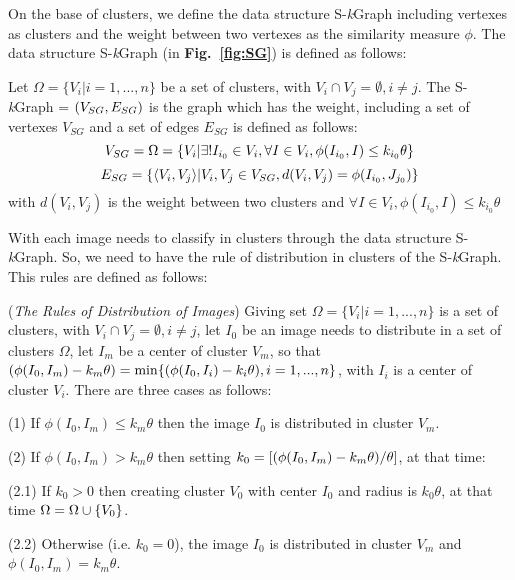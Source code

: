\documentclass{amcs}
\begin{document}
On the base of clusters, we define the data structure S-\textit{k}Graph including vertexes as clusters and the weight between two vertexes as the similarity measure $\phi $. The data structure S-\textit{k}Graph (in \textbf{Fig.~\ref{fig:SG}}) is defined as follows:
\begin{definition}{} Let $\Omega  = \{ {V_i}|i = 1,...,n\} $ be a set of clusters, with ${V_i} \cap {V_j} = \emptyset ,i \ne j$. The S-\textit{k}Graph = $\left( {{V_{SG}},{\rm{ }}{E_{SG}}} \right)$ is the graph which has the weight, including a set of vertexes ${V_{SG}}$ and a set of edges ${E_{SG}}$ is defined as follows:
\begin{equation}
\footnotesize {V_{SG}} = \Omega  = {\rm{\{ }}{V_i}|\exists !{I_{{i_0}}} \in {V_i},\forall I \in {V_i},\phi ({I_{{i_0}}},I) \le {k_{{i_0}}}\theta{\rm{\} }}
\end{equation}
\begin{equation}
\footnotesize {E_{SG}} = \{ \langle {V_i},{V_j}\rangle |{V_i},{V_j} \in {V_{SG}},d({V_i},{V_j}) = \phi ({I_{{i_0}}},{J_{{j_0}}})\}
\end{equation}
with $d({V_i},{V_j})$ is the weight between two clusters and $\forall I \in {V_i},\phi ({I_{{i_0}}},I) \le {k_{{i_0}}}\theta $
\label{def:SG}
\end{definition}

With each image needs to classify in clusters through the data structure S-\textit{k}Graph. So, we need to have the rule of distribution in clusters of the S-\textit{k}Graph. This rules are defined as follows:
\begin{definition}{} (\textit{The Rules of Distribution of Images}) Giving set $\Omega  = \{ {V_i}|i = 1,...,n\} $ is a set of clusters, with ${V_i} \cap {V_j} = \emptyset ,i \ne j$, let ${I_0}$ be an image needs to distribute in a set of clusters $\Omega $, let ${I_m}$ be a center of cluster ${V_m}$, so that $(\phi ({I_0},{I_m}) - {k_m}\theta ) = \min \{ (\phi ({I_0},{I_i}) - {k_i}\theta ),i = 1,...,n{\rm{\} }}$, with ${I_i}$ is a center of cluster ${V_i}$. There are three cases as follows:

(1) If $\phi ({I_0},{I_m}) \le {k_m}\theta $ then the image ${I_0}$ is distributed in cluster ${V_m}$.

(2) If $\phi ({I_0},{I_m}) > {k_m}\theta $ then setting ${k_0} = \left[ {{{(\phi ({I_0},{I_m}) - {k_m}\theta )} \mathord{\left/
 {\vphantom {{(\phi ({I_0},{I_m}) - {k_m}\theta )} \theta }} \right.
 \kern-\nulldelimiterspace} \theta }} \right]$, at that time: 

(2.1) If ${k_0} > 0$ then creating cluster ${V_0}$ with center ${I_0}$ and radius is ${k_0}\theta $, at that time $\Omega  = \Omega  \cup {\rm{\{ }}{V_0}{\rm{\} }}$.

(2.2) Otherwise (i.e. ${k_0} = 0$), the image ${I_0}$ is distributed in cluster ${V_m}$ and $\phi ({I_0},{I_m}) = {k_m}\theta $.
\label{def:rulesSG}
\end{definition}
\end{document}
